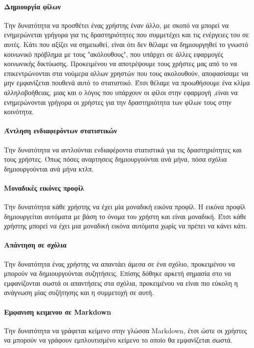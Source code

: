 \documentclass[nonacm, language=english, language=greek]{acmart}
\newcommand{\en}[1]{\textlatin{#1}}
\begin{document}
\paragraph{Δημιουργία φίλων}
Την δυνατότητα να προσθέτει ένας χρήστης έναν άλλο, με σκοπό να μπορεί να
ενημερώνεται γρήγορα για τις δραστηριότητες που συμμετέχει και τις ενέργειες
του σε αυτές. Κάτι που αξίζει να σημειωθεί, είναι ότι δεν θέλαμε να
δημιουργηθεί το γνωστό κοινωνικό πρόβλημα με τους "ακόλουθους", που
υπάρχει σε άλλες εφαρμογές κοινωνικής δικτύωσης. Προκειμένου να
αποτρέψουμε τους χρήστες μας από το να επικεντρώνονται στα νούμερα αλλων χρηστών που τους ακολουθούν, 
αποφασίσαμε να μην εμφανίζεται πουθενά αυτό το στατιστικό. Έτσι θέλαμε να προωθήσουμε ένα κλίμα αλληλοβοήθειας, μιας και ο λόγος που υπάρχουν οι
φίλοι στην εφαρμογή ,είναι να ενημερώνονται γρήγορα οι χρήστες για την
δραστηριότητα των φίλων τους στην κοινότητα.

\paragraph{Άντληση ενδιαφερόντων στατιστικών}
Την δυνατότητα να αντλούνται ενδιαφέροντα στατιστικά για τις δραστηριότητες και
τους χρήστες. Όπως πόσες αναρτησεις δημιουργούνται ανά μήνα, πόσα σχόλια
δημιουργούνται ανά μήνα κτλπ.

\paragraph{Μοναδικές εικόνες προφίλ}
Την δυνατότητα κάθε χρήστης να έχει μία μοναδική εικόνα προφίλ. Η εικόνα προφίλ
δημιουργείται αυτόματα με βάση το όνομα του χρήστη και είναι μοναδική. Έτσι
κάθε χρήστης μπορεί να έχει μια μοναδική εικόνα αυτόματα χωρίς να πρέπει να
κάνει κάτι.

\paragraph{Απάντηση σε σχόλια}
Την δυνατότητα ένας χρήστης να απαντάει άμεσα σε ένα σχόλιο, προκειμένου να μπορούν να δημιουργούνται συζητήσεις. Επίσης δόθηκε αρκετή σημασία στο να εμφανίζονται σωστά οι απαντήσεις στα σχόλια, προκειμένου να είναι πιο εύκολη η ανάγνωση μίας συζήτησης και η συμμετοχή σε αυτή.

\paragraph{Εμφανιση κειμενου σε \en{Markdown}} 
Την δυνατότητα να γράφεται κείμενο στην γλώσσα \en{Markdown}, έτσι ώστε οι χρήστες να μπορούν να γράφουν εμπλουτισμένο κείμενο το οποίο θα εμφανίζεται σωστά.
\end{document}
